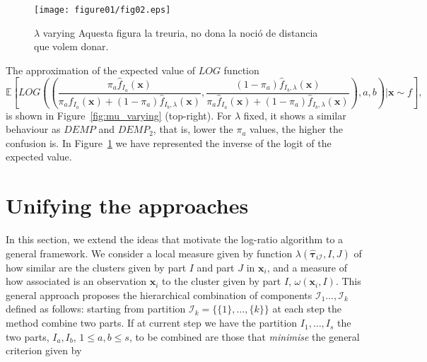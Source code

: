 \documentclass[10pt, a4paper]{article}
\newcommand{\m}[1]{\boldsymbol{#1}}
\begin{document}
\begin{figure}[!h]
\centering
\texttt{[image: figure01/fig02.eps]}
\caption{$\lambda$ varying {\color{red} Aquesta figura la treuria, no dona la noció de distancia que volem donar.}}
\label{fig:mu_varying_logit}
\end{figure}

The approximation of the expected value of $LOG$ function
\[
\mathbb{E}\left[LOG \left(
 \left( 
 \frac{\pi_a \hat{f}_{I_a}(\m x)}{\pi_a \hat{f}_{I_a}(\m x) + (1-\pi_a) \hat{f}_{I_b, \lambda}(\m x)}, 
 \frac{(1-\pi_a) \hat{f}_{I_b, \lambda}(\m x)}{\pi_a \hat{f}_{I_a}(\m x) + (1-\pi_a) \hat{f}_{I_b, \lambda}(\m x)} \right), a, b\right) | \m x \sim f \right],
\]
is shown in Figure~\ref{fig:mu_varying} (top-right). For $\lambda$ fixed, it shows a similar behaviour as $DEMP$ and $DEMP_2$, that is, lower the $\pi_a$ values, the higher the confusion is. In Figure~\ref{fig:mu_varying_logit} we have represented the inverse of the logit of the expected value.



%
%
%
%

\section{Unifying the approaches}
\label{confusion}


In this section, we extend the ideas that motivate the log-ratio algorithm to a general framework. We consider a local measure given by function $\lambda(\hat{\m\tau}_{i \mathcal{I}}, I, J)$ of how similar are the clusters given by part $I$ and part $J$ in $\m x_i$, and a measure of how associated is an observation $\m x_i$ to the cluster given by part $I$, $\omega(\m x_i, I)$. This general approach proposes the hierarchical combination of components $\mathcal{I}_1 \dots, \mathcal{I}_k$ defined as follows: starting from partition $\mathcal{I}_k = \{\{1\},\dots, \{k\}\}$ at each step the method combine two parts. If at current step we have the partition  $I_1, \dots, I_s$ the two parts, $I_a, I_b$, $1 \leq a,b \leq s$,  to be combined are those that \emph{minimise} the general criterion given by
\end{document}
